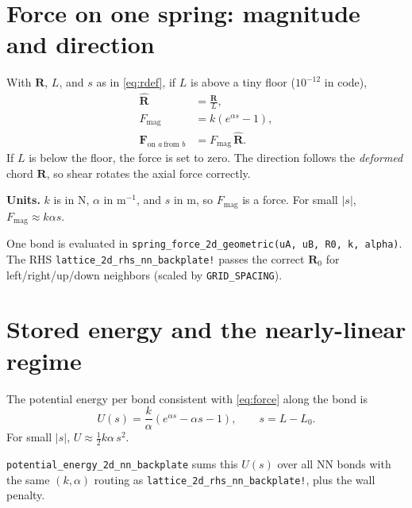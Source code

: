 \documentclass[11pt,a4paper]{article}
\begin{document}
\section{Force on one spring: magnitude and direction}
\label{sec:force-law}

With $\mathbf{R}$, $L$, and $s$ as in \eqref{eq:rdef}, if $L$ is above a tiny floor ($10^{-12}$ in code),
\begin{align}
\hat{\mathbf{R}} &= \frac{\mathbf{R}}{L}, \\
F_{\mathrm{mag}} &= k\left(e^{\alpha s}-1\right), \\
\mathbf{F}_{\text{on }a\,\text{from }b} &= F_{\mathrm{mag}}\,\hat{\mathbf{R}}.
\label{eq:force}
\end{align}
If $L$ is below the floor, the force is set to zero. The direction follows the \emph{deformed} chord $\mathbf{R}$, so shear rotates the axial force correctly.

\medskip
\noindent\textbf{Units.} $k$ is in N, $\alpha$ in m$^{-1}$, and $s$ in m, so $F_{\mathrm{mag}}$ is a force. For small $|s|$, $F_{\mathrm{mag}}\approx k\alpha s$.

\begin{codebox}
One bond is evaluated in \texttt{spring\_force\_2d\_geometric(uA, uB, R0, k, alpha)}. The RHS \texttt{lattice\_2d\_rhs\_nn\_backplate!} passes the correct $\mathbf{R}_0$ for left/right/up/down neighbors (scaled by \texttt{GRID\_SPACING}).
\end{codebox}

\section{Stored energy and the nearly-linear regime}
\label{sec:energy}

The potential energy per bond consistent with \eqref{eq:force} along the bond is
\begin{equation}
U(s) = \frac{k}{\alpha}\left(e^{\alpha s} - \alpha s - 1\right),
\qquad s=L-L_0.
\end{equation}
For small $|s|$, $U\approx \tfrac{1}{2}k\alpha\,s^2$.

\begin{codebox}
\texttt{potential\_energy\_2d\_nn\_backplate} sums this $U(s)$ over all NN bonds with the same $(k,\alpha)$ routing as \texttt{lattice\_2d\_rhs\_nn\_backplate!}, plus the wall penalty.
\end{codebox}
\end{document}
